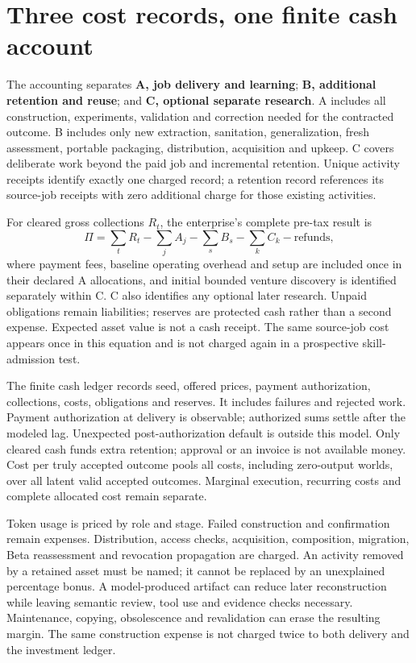 \documentclass[11pt,letterpaper]{article}
\begin{document}
\section{Three cost records, one finite cash account}
The accounting separates \textbf{A, job delivery and learning}; \textbf{B, additional retention and reuse}; and \textbf{C, optional separate research}. A includes all construction, experiments, validation and correction needed for the contracted outcome. B includes only new extraction, sanitation, generalization, fresh assessment, portable packaging, distribution, acquisition and upkeep. C covers deliberate work beyond the paid job and incremental retention. Unique activity receipts identify exactly one charged record; a retention record references its source-job receipts with zero additional charge for those existing activities.

For cleared gross collections $R_t$, the enterprise's complete pre-tax result is
\begin{equation}
\Pi=\sum_t R_t-\sum_j A_j-\sum_s B_s-\sum_k C_k-\mathrm{refunds},
\end{equation}
where payment fees, baseline operating overhead and setup are included once in their declared A allocations, and initial bounded venture discovery is identified separately within C. C also identifies any optional later research. Unpaid obligations remain liabilities; reserves are protected cash rather than a second expense. Expected asset value is not a cash receipt. The same source-job cost appears once in this equation and is not charged again in a prospective skill-admission test.

The finite cash ledger records seed, offered prices, payment authorization, collections, costs, obligations and reserves. It includes failures and rejected work. Payment authorization at delivery is observable; authorized sums settle after the modeled lag. Unexpected post-authorization default is outside this model. Only cleared cash funds extra retention; approval or an invoice is not available money. Cost per truly accepted outcome pools all costs, including zero-output worlds, over all latent valid accepted outcomes. Marginal execution, recurring costs and complete allocated cost remain separate.

Token usage is priced by role and stage. Failed construction and confirmation remain expenses. Distribution, access checks, acquisition, composition, migration, Beta reassessment and revocation propagation are charged. An activity removed by a retained asset must be named; it cannot be replaced by an unexplained percentage bonus. A model-produced artifact can reduce later reconstruction while leaving semantic review, tool use and evidence checks necessary. Maintenance, copying, obsolescence and revalidation can erase the resulting margin. The same construction expense is not charged twice to both delivery and the investment ledger.
\end{document}
